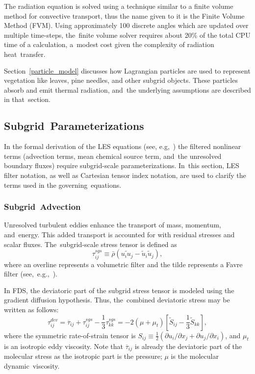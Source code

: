 \documentclass[atmosphere,article,accept,moreauthors,pdftex]{Definitions/mdpi}
\begin{document}
The radiation equation is solved using a technique similar to a finite volume method for convective transport, thus the name given to it is the Finite Volume Method (FVM). Using approximately 100 discrete angles which are updated over multiple time-steps, the~finite volume solver requires about 20\% of the total CPU time of a calculation, a~modest cost given the complexity of radiation heat~transfer.

Section~\ref{particle_model} discusses how Lagrangian particles are used to represent vegetation like leaves, pine needles, and other subgrid objects. These particles absorb and emit thermal radiation, and~the underlying assumptions are described in that~section.

\subsection{Subgrid~Parameterizations} \label{sec:subgrid}

In the formal derivation of the LES equations (see, e.g,~\cite{Pope:2000,FDS_MathVal_Guides}) the filtered nonlinear terms (advection terms, mean chemical source term, and~the unresolved boundary fluxes) require subgrid-scale parameterizations.  In~this section, LES filter notation, as well as Cartesian tensor index notation, are used to clarify the terms used in the governing~equations.

\subsubsection{Subgrid~Advection}

Unresolved turbulent eddies enhance the transport of mass, momentum, and~energy.  This added transport is accounted for with residual stresses and scalar fluxes.  The~subgrid-scale stress tensor is defined as
\begin{equation}
\tau_{ij}^{sgs} \equiv \bar{\rho}(\widetilde{u_i u_j} - \tilde{u}_i \tilde{u}_j),
\end{equation}
where an overline represents a volumetric filter and the tilde represents a Favre filter (\mbox{see, e.g.,~\cite{Poinsot:TNC}}).

In FDS, the deviatoric part of the subgrid stress tensor is modeled using the gradient diffusion hypothesis.  Thus, the~combined deviatoric stress may be written as follows:
\begin{equation}
\tau_{ij}^{dev} = \overline{\tau}_{ij} + \tau_{ij}^{sgs} - \frac{1}{3} \tau_{kk}^{sgs} = -2 (\mu + \mu_t) \left[ \tilde{S}_{ij} - \frac{1}{3} \tilde{S}_{kk} \right],
\end{equation}
where the symmetric rate-of-strain tensor is $S_{ij} \equiv \frac{1}{2}(\partial u_i/\partial x_j + \partial u_j/\partial x_i)$, and $\mu_t$ is an isotropic eddy viscosity.  Note that $\overline{\tau}_{ij}$ is already the deviatoric part of the molecular stress as the isotropic part is the pressure; $\mu$ is the molecular dynamic~viscosity.
\end{document}
